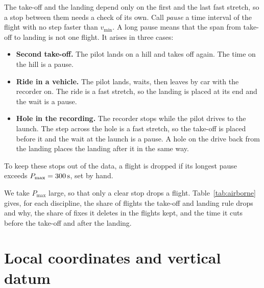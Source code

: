 The take-off and the landing depend only on the first and the last fast stretch, so a stop
between them needs a check of its own. Call \emph{pause} a time interval of the flight with no step faster
than $v_{\min}$. A long pause means that the span from take-off to landing is not one
flight. It arises in three cases:
\begin{itemize}
\item \textbf{Second take-off.} The pilot lands on a hill and takes off again. The time on
  the hill is a pause.
\item \textbf{Ride in a vehicle.} The pilot lands, waits, then leaves by car with the
  recorder on. The ride is a fast stretch, so the landing is placed at its end and the
  wait is a pause.
\item \textbf{Hole in the recording.} The recorder stops while the pilot drives to the
  launch. The step across the hole is a fast stretch, so the take-off is placed before
  it and the wait at the launch is a pause. A hole on the drive back from the landing
  places the landing after it in the same way.
\end{itemize}
To keep these stops out of the data, a flight is dropped if its longest pause exceeds
$P_{\max}=\SI{300}{\second}$, set by hand.

We take $P_{\max}$ large, so that only a clear stop drops a flight. Table~\ref{tab:airborne}
gives, for each discipline, the share of flights the take-off and landing rule drops and
why, the share of fixes it deletes in the flights kept, and the time it cuts before the
take-off and after the landing.

\begin{table}[htbp]
\centering\small
\caption{The take-off and landing rule with $v_{\min}$, $T_{\min}$ and $P_{\max}$ as above,
in the flights kept by the previous steps. Dropped: share of the flights dropped, for having
no fast stretch (No stretch) and for a longest pause above $P_{\max}$ (Pause); most are
dropped for their pause. Fixes deleted: fixes before the take-off and after the landing, as a share of all the
fixes of the flights kept as they reach this rule. Cut before: seconds from the first fix of the recording to the take-off. Cut after:
seconds from the landing to the last fix. Both are given in the flights kept, as median and
90th percentile.}
\label{tab:airborne}

\end{table}

\section{Local coordinates and vertical datum}
\label{sec:frame}

